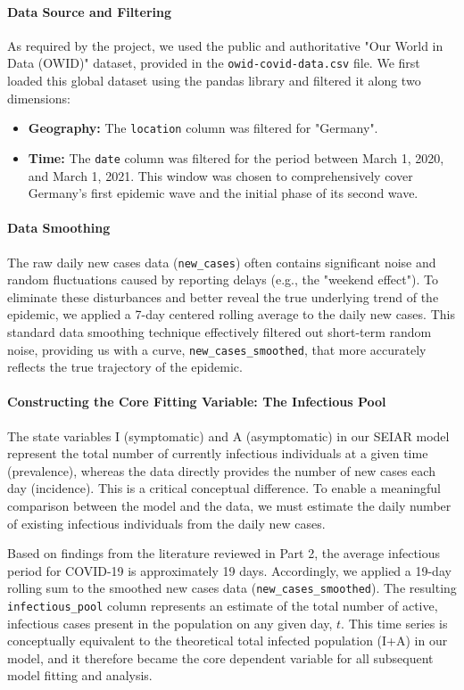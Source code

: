 \documentclass[12pt, a4paper]{article}
\begin{document}
\paragraph{Data Source and Filtering}
As required by the project, we used the public and authoritative "Our World in Data (OWID)" dataset, provided in the \texttt{owid-covid-data.csv} file. We first loaded this global dataset using the pandas library and filtered it along two dimensions:
\begin{itemize}
    \item \textbf{Geography:} The \texttt{location} column was filtered for "Germany".
    \item \textbf{Time:} The \texttt{date} column was filtered for the period between March 1, 2020, and March 1, 2021. This window was chosen to comprehensively cover Germany's first epidemic wave and the initial phase of its second wave.
\end{itemize}

\paragraph{Data Smoothing}
The raw daily new cases data (\texttt{new\_cases}) often contains significant noise and random fluctuations caused by reporting delays (e.g., the "weekend effect"). To eliminate these disturbances and better reveal the true underlying trend of the epidemic, we applied a 7-day centered rolling average to the daily new cases. This standard data smoothing technique effectively filtered out short-term random noise, providing us with a curve, \texttt{new\_cases\_smoothed}, that more accurately reflects the true trajectory of the epidemic.

\paragraph{Constructing the Core Fitting Variable: The Infectious Pool}
The state variables I (symptomatic) and A (asymptomatic) in our SEIAR model represent the total number of currently infectious individuals at a given time (prevalence), whereas the data directly provides the number of new cases each day (incidence). This is a critical conceptual difference. To enable a meaningful comparison between the model and the data, we must estimate the daily number of existing infectious individuals from the daily new cases.

Based on findings from the literature reviewed in Part 2, the average infectious period for COVID-19 is approximately 19 days. Accordingly, we applied a 19-day rolling sum to the smoothed new cases data (\texttt{new\_cases\_smoothed}). The resulting \texttt{infectious\_pool} column represents an estimate of the total number of active, infectious cases present in the population on any given day, $t$. This time series is conceptually equivalent to the theoretical total infected population (I+A) in our model, and it therefore became the core dependent variable for all subsequent model fitting and analysis.
\end{document}
